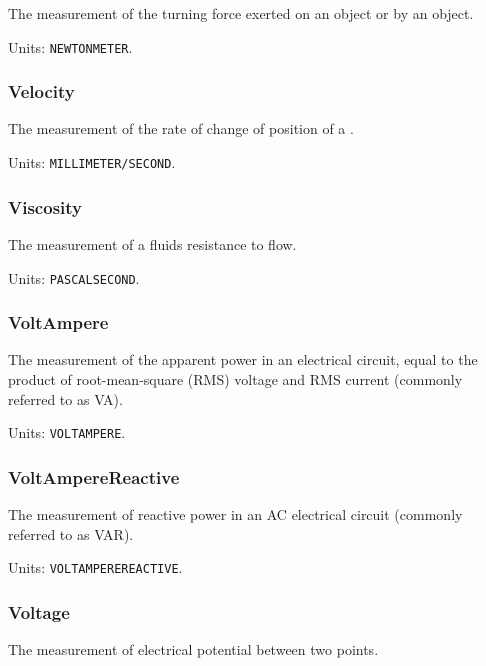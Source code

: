 The measurement of the turning force exerted on an object or by an object.


Units: \texttt{NEWTON\textunderscore METER}.

\subsubsection{Velocity}
\label{sec:Velocity}



The measurement of the rate of change of position of a .


Units: \texttt{MILLIMETER/SECOND}.

\subsubsection{Viscosity}
\label{sec:Viscosity}



The measurement of a fluids resistance to flow.


Units: \texttt{PASCAL\textunderscore SECOND}.

\subsubsection{VoltAmpere}
\label{sec:VoltAmpere}



The measurement of the apparent power in an electrical circuit, equal to the product of root-mean-square (RMS) voltage and RMS current (commonly referred to as VA).


Units: \texttt{VOLT\textunderscore AMPERE}.

\subsubsection{VoltAmpereReactive}
\label{sec:VoltAmpereReactive}



The measurement of reactive power in an AC electrical circuit (commonly referred to as VAR).


Units: \texttt{VOLT\textunderscore AMPERE\textunderscore REACTIVE}.

\subsubsection{Voltage}
\label{sec:Voltage}



The measurement of electrical potential between two points.


